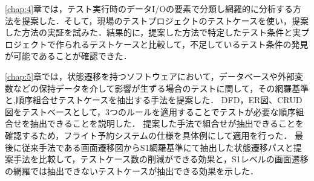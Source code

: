\documentclass[10pt,a4j]{jarticle}
\begin{document}
\ref{chap:4}章では，テスト実行時のデータI/Oの要素で分類し網羅的に分析する方法を提案した．そして，現場のテストプロジェクトのテストケースを使い，提案した方法の実証を試みた．結果的に，提案した方法で特定したテスト条件と実プロジェクトで作られるテストケースと比較して，不足しているテスト条件の発見が可能であることが確認できた．

\ref{chap:5}章では，状態遷移を持つソフトウェアにおいて，データベースや外部変数などの保持データを介して影響が生ずる場合のテストに関して，その網羅基準と,順序組合せテストケースを抽出する手法を提案した．
DFD，ER図、CRUD図をテストベースとして，3つのルールを適用することでテストが必要な順序組合せを抽出できることを説明した．
提案した手法で組合せが抽出できることを確認するため，フライト予約システムの仕様を具体例にして適用を行った．
最後に従来手法である画面遷移図からS1網羅基準にて抽出した状態遷移パスと提案手法を比較して，テストケース数の削減ができる効果と，S1レベルの画面遷移の網羅では抽出できないテストケースが抽出できる効果を示した．

\nocite{*}


\end{document}
